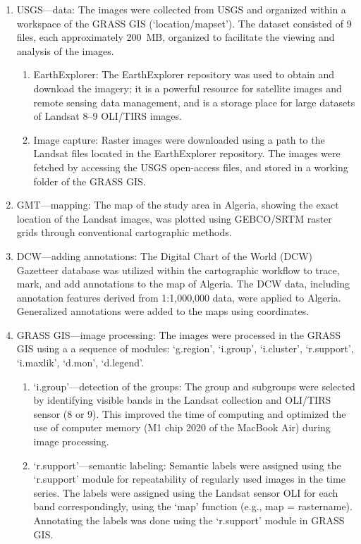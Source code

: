\documentclass[asi,article,accept,pdftex,moreauthors]{Definitions/mdpi}
\begin{document}
\begin{enumerate}
\itemsep0em
	\item USGS---data: %
	 The images were collected from USGS and organized within {a} workspace of the GRASS GIS {(`location/mapset')}. The dataset consisted of 9 files, each approximately \mbox{200 MB}, organized to facilitate the viewing and analysis of the images. 
	\begin{enumerate}
		\item EarthExplorer: The EarthExplorer repository was used to obtain and download the imagery; it is a powerful resource for satellite {images and }remote sensing data management, and is a storage place for large datasets of Landsat 8--9 OLI/TIRS images.
		\item Image capture: Raster images were downloaded using a path to the Landsat files located in the EarthExplorer repository. The images were fetched by accessing the USGS open-access files, and stored in a working folder of the GRASS GIS.		
	\end{enumerate}
	\item GMT---mapping: The map of the study area in Algeria, showing the exact location of the Landsat images, was plotted using GEBCO/SRTM raster grids{ through} {conventional }cartographic methods.	
	\item DCW---adding annotations: The Digital Chart of the World (DCW) Gazetteer database was utilized within the cartographic workflow to trace, mark, and add annotations to the map of Algeria. The DCW data, including annotation features derived from 1:1,000,000 data, were applied to Algeria. Generalized annotations were added to the maps using coordinates.	
	\item GRASS GIS---image processing: The images were processed in the GRASS GIS using a a sequence of modules: `g.region', `i.group', `i.cluster', `r.support', `i.maxlik', `d.mon', `d.legend'.	
		\begin{enumerate}
			\item `i.group'---detection of the groups: The group and subgroups were selected by identifying visible bands in the Landsat collection and {OLI/TIRS} sensor (8 or 9). This improved the time of computing and optimized the use of {computer }memory {(M1 chip 2020 of the MacBook Air)} during image processing.  
			\item `r.support'---semantic labeling: Semantic labels were assigned using the `r.support' module for repeatability of regularly used images in the time series. The labels were assigned using the Landsat sensor OLI for each band correspondingly, using the `map' function (e.g., map = rastername). Annotating the labels was done using the `r.support' module in GRASS GIS.

\end{enumerate}
\end{enumerate}
\end{document}

